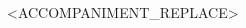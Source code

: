 \documentclass{article}[10pt]
\begin{document}
\begin{center}
        \begin{center}
            \begin{minipage}{3.5in}
                \vspace{-0.1in}
                \begin{multicols}{2}
                    \begin{center}
                        \begin{small}
                            <ACCOMPANIMENT_REPLACE>
                        \end{small}
                    \end{center}
                \end{multicols}
            \end{minipage}
        \end{center}

    \end{center}
    \vfill

    \pagebreak

\end{document}
